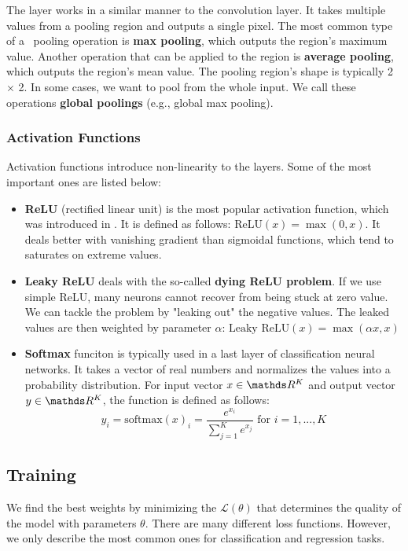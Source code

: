 The layer works in a similar manner to the convolution layer. It takes multiple
values from a pooling region and outputs a single pixel. The most common type of
a~ pooling operation is \textbf{max pooling}, which outputs the region's
maximum value. Another operation that can be applied to the region is
\textbf{average pooling}, which outputs the region's mean value. The pooling
region's shape is typically 2 $\times$ 2. In some cases, we want to
pool from the whole input. We call these operations \textbf{global poolings}
(e.g., global max pooling).

\subsubsection{Activation Functions}
\label{afunctions}

Activation functions introduce non-linearity to the layers. Some of the most
important ones are listed below:
\begin{itemize}
    \item \textbf{ReLU} (rectified linear unit) is the most popular activation
          function, which was introduced in \cite{pmlr-v15-glorot11a}. It is defined
          as follows: $\text{ReLU}(x) = \max(0, x)$. It deals better with vanishing
          gradient than sigmoidal functions, which tend to saturates on extreme values.
    \item \textbf{Leaky ReLU} deals with the so-called
          \textbf{dying ReLU problem}. If we use simple ReLU, many neurons cannot
          recover from being stuck at zero value. We can tackle the problem by
          "leaking out" the negative values. The leaked values are then weighted by
          parameter $\alpha$: $\text{Leaky ReLU}(x) = \max(\alpha x, x)$
    \item \textbf{Softmax} funciton is typically used in a last layer of
          classification neural networks. It takes a vector of real numbers and
          normalizes the values into a probability distribution. For input vector
          $x \in \real^K$ and output vector $y \in \real^K$, the function is defined
          as follows:
          $$
              y_i = \text{softmax}(x)_i = \frac{e^{x_i}}{\sum\limits^{K}_{j = 1}
                  e^{x_j}} \text{ for } i = 1,...,K
          $$
\end{itemize}

\subsection{Training}
\label{sec:training}
We find the best weights by minimizing the  $\mathcal{L(\theta)}$
that determines the quality of the model with parameters $\theta$. There are
many different loss functions. However, we only describe the most common ones
for classification and regression tasks.

